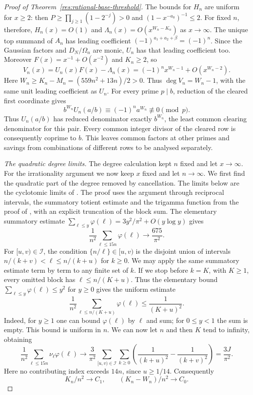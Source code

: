 \documentclass[11pt]{article}
\begin{document}
\begin{proof}[Proof of Theorem~\ref{res:rational-base-threshold}]
The bounds for $H_n$ are uniform for $x\ge2$:
then $P\ge\prod_{j\ge1}(1-2^{-j})>0$ and
$(1-x^{-a_0})^{-1}\le2$. For fixed $n$, therefore,
$H_n(x)=O(1)$ and $\Lambda_n(x)=O(x^{W_n-K_n})$ as $x\to\infty$.
The unique top summand of $A_n$ has leading coefficient
$(-1)^{a_1+a_2+\beta}=(-1)^n$. Since the Gaussian factors and
$D_N/\Omega_n$ are monic, $U_n$ has that leading coefficient too.
Moreover $F(x)=x^{-1}+O(x^{-2})$ and $K_n\ge2$, so
\[
 V_n(x)=U_n(x)F(x)-\Lambda_n(x)
       =(-1)^n x^{W_n-1}+O(x^{W_n-2}).
\]
Here $W_n\ge K_n-M_n=(559n^2+13n)/2>0$. Thus
$\deg V_n=W_n-1$, with the same unit leading coefficient as $U_n$.
For every prime $p\mid b$, reduction of the cleared first coordinate gives
\[
 b^{W_n}U_n(a/b)\equiv(-1)^n a^{W_n}\not\equiv0\pmod p.
\]
Thus $U_n(a/b)$ has reduced denominator exactly $b^{W_n}$,
the least common clearing denominator for this pair. Every common integer divisor of the cleared row is consequently
coprime to $b$. This leaves common factors at other primes and
savings from combinations of different rows to be analysed separately.

\emph{The quadratic degree limits.}
The degree calculation kept $n$ fixed and let $x\to\infty$.
For the irrationality argument we now keep $x$ fixed and let
$n\to\infty$. We first find the quadratic part of the degree
removed by cancellation.
The limits below are the cyclotomic limits of
\cite[Lemmas~1--2, p.~155]{zudilin2004}.  The proof uses the argument through
reciprocal intervals, the summatory totient estimate and the trigamma function
from the proof of \cite[Lemma~1, p.~466]{zudilin2002}, with an explicit
truncation of the block sum.
The elementary summatory estimate
$\sum_{\ell\le y}\varphi(\ell)=3y^2/\pi^2+O(y\log y)$ gives
\[
 \frac1{n^2}\sum_{\ell\le15n}\varphi(\ell)\longrightarrow\frac{675}{\pi^2}.
\]
For $[u,v)\in\mathcal I$, the condition $\{n/\ell\}\in[u,v)$ is the
disjoint union of intervals
$n/(k+v)<\ell\le n/(k+u)$ for $k\ge0$.
We may apply the same summatory estimate term by term to any finite
set of $k$. If we stop before $k=K$, with $K\ge1$, every omitted
block has $\ell\le n/(K+u)$. Thus the elementary bound
$\sum_{\ell\le y}\varphi(\ell)\le y^2$ for $y\ge0$ gives the uniform
estimate
\[
 \frac1{n^2}\sum_{\ell\le n/(K+u)}\varphi(\ell)
 \le\frac1{(K+u)^2}.
\]
Indeed, for $y\ge1$ one can bound $\varphi(\ell)$ by $\ell$ and sum;
for $0\le y<1$ the sum is empty. This bound is uniform in $n$.
We can now let $n$ and then $K$ tend to infinity, obtaining
\[
 \frac1{n^2}\sum_{\ell\le15n}\nu_\ell\varphi(\ell)
 \longrightarrow\frac3{\pi^2}
 \sum_{[u,v)\in\mathcal I}\sum_{k\ge0}
 \left(\frac1{(k+u)^2}-\frac1{(k+v)^2}\right)=\frac{3J}{\pi^2}.
\]
Here no contributing index exceeds $14n$, since $u\ge1/14$.
Consequently
\[
 K_n/n^2\longrightarrow C_1,\qquad
 (K_n-W_n)/n^2\longrightarrow C_0.
\]


\end{proof}
\end{document}

